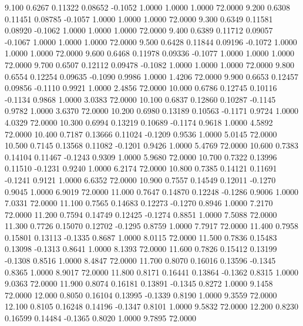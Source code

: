    9.100   0.6267   0.11322   0.08652  -0.1052   1.0000   1.0000   1.0000  72.0000
   9.200   0.6308   0.11451   0.08785  -0.1057   1.0000   1.0000   1.0000  72.0000
   9.300   0.6349   0.11581   0.08920  -0.1062   1.0000   1.0000   1.0000  72.0000
   9.400   0.6389   0.11712   0.09057  -0.1067   1.0000   1.0000   1.0000  72.0000
   9.500   0.6428   0.11844   0.09196  -0.1072   1.0000   1.0000   1.0000  72.0000
   9.600   0.6468   0.11978   0.09336  -0.1077   1.0000   1.0000   1.0000  72.0000
   9.700   0.6507   0.12112   0.09478  -0.1082   1.0000   1.0000   1.0000  72.0000
   9.800   0.6554   0.12254   0.09635  -0.1090   0.9986   1.0000   1.4206  72.0000
   9.900   0.6653   0.12457   0.09856  -0.1110   0.9921   1.0000   2.4856  72.0000
  10.000   0.6786   0.12745   0.10116  -0.1134   0.9868   1.0000   3.0383  72.0000
  10.100   0.6837   0.12860   0.10287  -0.1145   0.9782   1.0000   3.6370  72.0000
  10.200   0.6980   0.13189   0.10563  -0.1171   0.9724   1.0000   4.0329  72.0000
  10.300   0.6994   0.13219   0.10689  -0.1174   0.9618   1.0000   4.5892  72.0000
  10.400   0.7187   0.13666   0.11024  -0.1209   0.9536   1.0000   5.0145  72.0000
  10.500   0.7145   0.13568   0.11082  -0.1201   0.9426   1.0000   5.4769  72.0000
  10.600   0.7383   0.14104   0.11467  -0.1243   0.9309   1.0000   5.9680  72.0000
  10.700   0.7322   0.13996   0.11510  -0.1231   0.9240   1.0000   6.2174  72.0000
  10.800   0.7385   0.14121   0.11691  -0.1241   0.9121   1.0000   6.6352  72.0000
  10.900   0.7557   0.14549   0.12011  -0.1270   0.9045   1.0000   6.9019  72.0000
  11.000   0.7647   0.14870   0.12248  -0.1286   0.9006   1.0000   7.0331  72.0000
  11.100   0.7565   0.14683   0.12273  -0.1270   0.8946   1.0000   7.2170  72.0000
  11.200   0.7594   0.14749   0.12425  -0.1274   0.8851   1.0000   7.5088  72.0000
  11.300   0.7726   0.15070   0.12702  -0.1295   0.8759   1.0000   7.7917  72.0000
  11.400   0.7958   0.15801   0.13113  -0.1335   0.8687   1.0000   8.0115  72.0000
  11.500   0.7836   0.15483   0.13098  -0.1313   0.8641   1.0000   8.1393  72.0000
  11.600   0.7826   0.15412   0.13199  -0.1308   0.8516   1.0000   8.4847  72.0000
  11.700   0.8070   0.16016   0.13596  -0.1345   0.8365   1.0000   8.9017  72.0000
  11.800   0.8171   0.16441   0.13864  -0.1362   0.8315   1.0000   9.0363  72.0000
  11.900   0.8074   0.16181   0.13891  -0.1345   0.8272   1.0000   9.1458  72.0000
  12.000   0.8050   0.16104   0.13995  -0.1339   0.8190   1.0000   9.3559  72.0000
  12.100   0.8105   0.16248   0.14196  -0.1347   0.8101   1.0000   9.5832  72.0000
  12.200   0.8230   0.16599   0.14484  -0.1365   0.8020   1.0000   9.7895  72.0000
